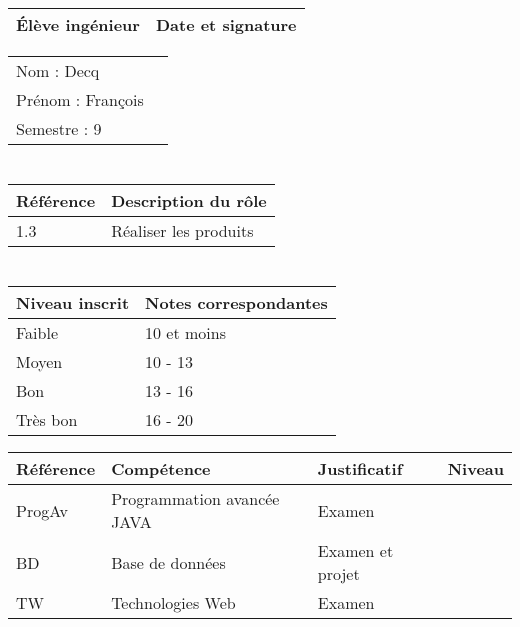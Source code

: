 \documentclass[11pt]{article}
\begin{document}

\begin{center}
\begin{table}[!hp]

	\begin{tabularx}{\linewidth}{|X|X|}
	\hline
	\rowcolor{gray!40} Élève ingénieur & Date et signature \\
	\hline
	\end{tabularx}
	\begin{tabularx}{\linewidth}{|X|X|}
	Nom : Decq &  \\ 
	Prénom : François & \\
	Semestre : 9 & \\
	\hline
	\end{tabularx}
\end{table}
\end{center}

\section*{\large\FR}

\begin{table}[!hp]
\centering
	\begin{tabularx}{\linewidth}{|X|X|}
	\hline
	\rowcolor{gray!40} Référence \WBSCourt & Description du rôle \\
	\hline
	 1.3 & Réaliser les produits \\
	 \hline
	\end{tabularx}
\end{table}


\section*{\large\FC}


\begin{table}[!hp]
\centering
	\begin{tabularx}{\linewidth}{|X|X|}
	\hline
	\rowcolor{gray!40} Niveau inscrit & Notes correspondantes \\
	\hline
	 Faible & 10 et moins \\
	 \hline
	 Moyen & 10 - 13 \\
	 \hline
	 Bon & 13 - 16 \\
	 \hline
	 Très bon & 16 - 20 \\
	 \hline
	\end{tabularx}
\end{table}


\begin{table}[!hp]
\centering
	\begin{tabularx}{\linewidth}{|X|X|X|X|}
	\hline
	\rowcolor{gray!40} Référence & Compétence & Justificatif & Niveau \\
	\hline
	 ProgAv & Programmation avancée JAVA & Examen &  \\
	\hline
	 BD & Base de données & Examen et projet &  \\
	 \hline
	 TW & Technologies Web & Examen &  \\
	 \hline
	\end{tabularx}
\end{table}
\end{document}
